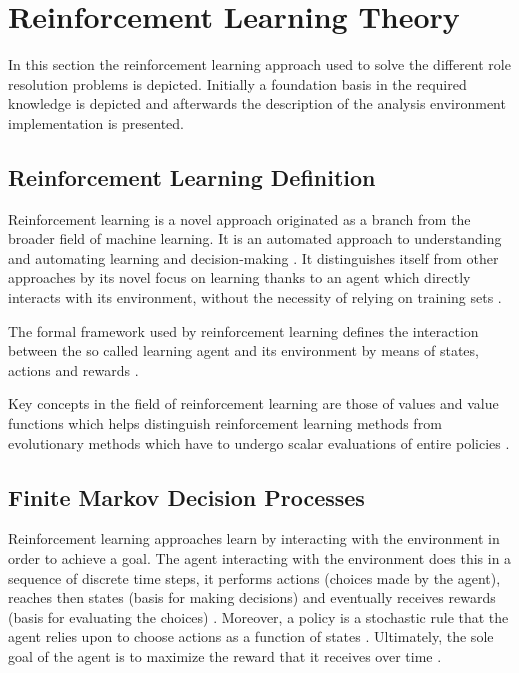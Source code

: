 \documentclass{seal_thesis}
\begin{document}
\section{Reinforcement Learning Theory}

In this section the reinforcement learning approach used to solve the different role resolution problems is depicted. Initially a foundation basis in the required knowledge is depicted and afterwards the description of the analysis environment implementation is presented.

\subsection{Reinforcement Learning Definition}

Reinforcement learning is a novel approach originated as a branch from the broader field of machine learning. It is an automated approach to understanding and automating learning and decision-making \cite[p. 15]{Sutton2017}. It distinguishes itself from other approaches by its novel focus on learning thanks to an agent which directly interacts with its environment, without the necessity of relying on training sets \cite[p. 15]{Sutton2017}.

The formal framework used by reinforcement learning defines the interaction between the so called learning agent and its environment by means of states, actions and rewards \cite[p. 15]{Sutton2017}.

Key concepts in the field of reinforcement learning are those of values and value functions which helps distinguish reinforcement learning methods from evolutionary methods which have to undergo scalar evaluations of entire policies \cite[p. 15]{Sutton2017}.

\subsection{Finite Markov Decision Processes}

Reinforcement learning approaches learn by interacting with the environment in order to achieve a goal. The agent interacting with the environment does this in a sequence of discrete time steps, it performs actions (choices made by the agent), reaches then states (basis for making decisions) and eventually receives rewards (basis for evaluating the choices) \cite[p. 73]{Sutton2017}. Moreover, a policy is a stochastic rule that the agent relies upon to choose actions as a function of states \cite[p. 73]{Sutton2017}. Ultimately, the sole goal of the agent is to maximize the reward that it receives over time \cite[p. 73]{Sutton2017}.
\end{document}
